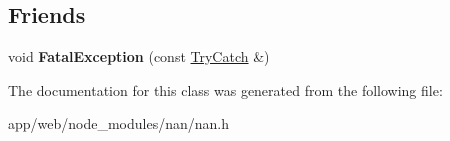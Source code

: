 \subsection*{Friends}
\begin{DoxyCompactItemize}
\item 
\mbox{\label{class_nan_1_1_try_catch_ad21948af5181a99dbf30c611cde801e9}} 
void {\bfseries Fatal\+Exception} (const \hyperlink{class_nan_1_1_try_catch}{Try\+Catch} \&)
\end{DoxyCompactItemize}


The documentation for this class was generated from the following file\+:\begin{DoxyCompactItemize}
\item 
app/web/node\+\_\+modules/nan/nan.\+h\end{DoxyCompactItemize}

